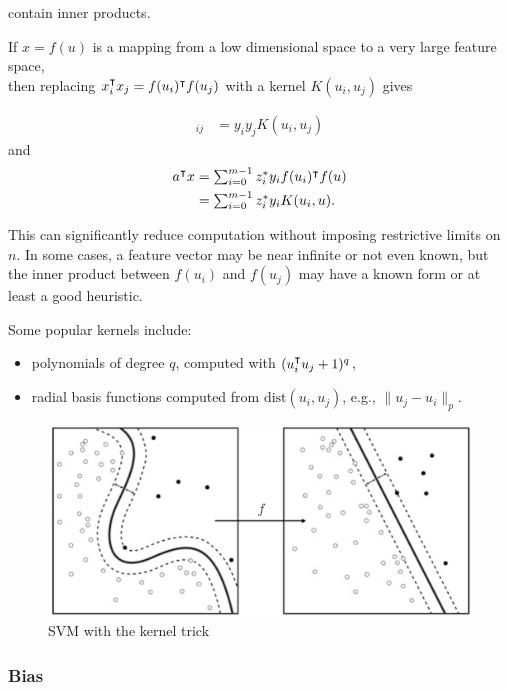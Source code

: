 \documentclass{article}
\begin{document}
    contain inner products. 
    
    If $x=f(u)$ is a mapping from a low dimensional space to a very large feature space,\\
    then replacing $x_i^\intercal x_j = f(u_i)^\intercal f(u_j)$ with a kernel $K(u_i,u_j)$ gives \cite[p.~321]{ml}

    \begin{align*}
        [Q_{\text{dual}\:}]_{ij}
        &=y_i y_j K(u_i,u_j)
    \end{align*}
    and
    \begin{align*}
        a^\intercal x &= \textstyle\sum_{i=0}^{m-1} z_i^*y_if(u_i)^\intercal f(u)\\
        &= \textstyle\sum_{i=0}^{m-1} z_i^*y_i K(u_i,u).
    \end{align*}

    This can significantly reduce computation without imposing restrictive limits on $n$.
    In some cases, a feature vector may be near infinite or not even known, but the inner product between
    $f(u_i)$ and $f(u_j)$ may have a known form or at least a good heuristic.

    Some popular kernels include:
    \begin{itemize}
        \item polynomials of degree $q$, computed with $(u_i^\intercal u_j+1)^q$,
        \item radial basis functions computed from $\text{dist}(u_i,u_j)$, e.g., $\|u_j-u_i\|_p$.
    \end{itemize}

    \clearpage

    \begin{figure}[h!]
        \centering
        \includegraphics[width=1\textwidth]{./figs/svm/svm_kernel.jpg}
        \caption{SVM with the kernel trick}
        \label{fig:svm_kernel}
    \end{figure}

\subsubsection{Bias}
\end{document}
